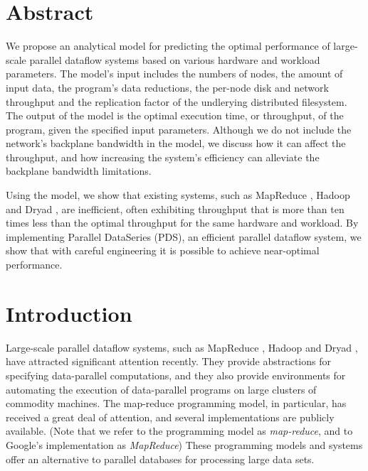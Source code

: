 \documentclass[ 11pt, letterpaper]{article}%
\begin{document}

\newenvironment{mylisting}


\newpage
\tableofcontents

\newpage

\section*{Abstract}
We propose an analytical model for predicting the optimal performance of
large-scale parallel dataflow systems based on various
hardware and workload parameters. The model's input includes the numbers
of nodes, the amount of input data, the program's data reductions, the per-node
disk and network throughput and the replication factor of the undlerying distributed filesystem. The output
of the model is the optimal execution time, or throughput, of the program,
given the specified input parameters. Although we do not include the
network's backplane bandwidth in the model, we discuss how it can affect the
throughput, and how increasing the system's efficiency can alleviate the
backplane bandwidth limitations.

Using the model, we show that existing systems, such as
MapReduce \cite{mapreduce}, Hadoop \cite{hadoop} and Dryad \cite{dryad}, are
inefficient, often exhibiting throughput that is more than ten times less than
the optimal throughput for the same hardware and workload. By implementing
Parallel DataSeries (PDS), an efficient parallel dataflow system, we show that
with careful engineering it is possible to achieve near-optimal performance.
\newpage

\section{Introduction}
Large-scale parallel dataflow systems, such as MapReduce \cite{mapreduce},
Hadoop \cite{hadoop} and Dryad \cite{dryad}, have attracted significant
attention recently. They provide abstractions for specifying data-parallel
computations, and they also provide environments for automating the execution
of data-parallel programs on large clusters of commodity machines. The
map-reduce programming model, in particular, has received a great deal of
attention, and several implementations \cite{hadoop, phoenix} are publicly
available. (Note that we refer to the programming model as \emph{map-reduce},
and to Google's implementation as \emph{MapReduce}) These programming models and
systems offer an alternative to parallel databases \cite{paralleldatabases} for processing large data sets.
\end{document}
